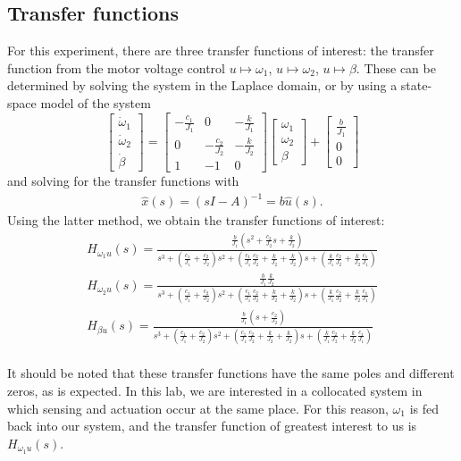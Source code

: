 \documentclass[11pt,titlepage]{article}
\begin{document}
	\subsection{Transfer functions}
	For this experiment, there are three transfer functions of interest: the transfer function from the motor voltage control $u\mapsto\omega_1$, $u\mapsto\omega_2$, $u\mapsto\beta$. These can be determined by solving the system in the Laplace domain, or by using a state-space model of the system
	\begin{equation}
		\begin{bmatrix}
			\dot \omega_1\\
			\dot \omega_2\\
			\dot \beta
		\end{bmatrix}=
	  	\begin{bmatrix}
	    		-\frac{c_1}{J_1} & 0 & -\frac{k}{J_1} \\
		    	0 & -\frac{c_2}{J_2} & -\frac{k}{J_2}\\
			1 & -1 & 0
	  	\end{bmatrix}
		\begin{bmatrix}
			\omega_1\\
			\omega_2\\
			\beta
		\end{bmatrix}+
		\begin{bmatrix}
			\frac{b}{J_1}\\
			0\\
			0
		\end{bmatrix}
	\end{equation}
	and solving for the transfer functions with 
	\begin{align}
		\hat{x}(s) = (sI-A)^{-1}=b\hat{u}(s).
	\end{align}
	 Using the latter method, we obtain the transfer functions of interest:\\
	 \begin{align}
	  	H_{\omega_{1}u}(s)= \frac{\frac{b}{J_1}(s^2+\frac{c_2}{J_2}s+\frac{k}{J_2})}{s^3+(\frac{c_1}{J_1}+\frac{c_2}{J_2})s^2+(\frac{c_1}{J_1}\frac{c_2}{J_2}+\frac{k}{J_2}+\frac{k}{J_2})s+(\frac{k}{J_1}\frac{c_2}{J_2}+\frac{k}{J_2}\frac{c_1}{J_1})} \\[1em]
	  	H_{\omega_{2}u}(s)= \frac{\frac{b}{J_1}\frac{k}{J_2}}{s^3+(\frac{c_1}{J_1}+\frac{c_2}{J_2})s^2+(\frac{c_1}{J_1}\frac{c_2}{J_2}+\frac{k}{J_2}+\frac{k}{J_2})s+(\frac{k}{J_1}\frac{c_2}{J_2}+\frac{k}{J_2}\frac{c_1}{J_1})}\\[1em]
	  	H_{\beta u}(s)=\frac{\frac{b}{J_1}(s+\frac{c_2}{J_2})}{s^3+(\frac{c_1}{J_1}+\frac{c_2}{J_2})s^2+(\frac{c_1}{J_1}\frac{c_2}{J_2}+\frac{k}{J_2}+\frac{k}{J_2})s+(\frac{k}{J_1}\frac{c_2}{J_2}+\frac{k}{J_2}\frac{c_1}{J_1})}
	  \end{align}\\
	  It should be noted that these transfer functions have the same poles and different zeros, as is expected. In this lab, we are interested in a collocated system in which sensing and actuation occur at the same place. For this reason, $\omega_1$ is fed back into our system, and the transfer function of greatest interest to us is $H_{\omega_{1}u}(s)$.
\end{document}
